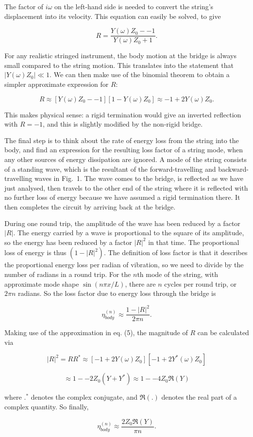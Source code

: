   The factor of $i \omega$ on the left-hand side is needed to convert the 
  string's displacement into its velocity. This equation can easily be solved, 
  to give 

  $$R=\dfrac{Y(\omega) Z_0 -- 1}{Y(\omega) Z_0 + 1} .\tag{4}$$ 

  For any realistic stringed instrument, the body motion at the bridge is 
  always small compared to the string motion. This translates into the 
  statement that $|Y(\omega) Z_0| \ll 1$. We can then make use of the binomial 
  theorem to obtain a simpler approximate expression for $R$: 

  $$R \approx [Y(\omega) Z_0 -- 1][1-Y(\omega) Z_0] \approx -1 +2Y(\omega) Z_0 
  .\tag{5}$$ 

  This makes physical sense: a rigid termination would give an inverted 
  reflection with $R=-1$, and this is slightly modified by the non-rigid 
  bridge. 

  The final step is to think about the rate of energy loss from the string into 
  the body, and find an expression for the resulting loss factor of a string 
  mode, when any other sources of energy dissipation are ignored. A mode of the 
  string consists of a standing wave, which is the resultant of the 
  forward-travelling and backward-travelling waves in Fig.\ 1. The wave comes 
  to the bridge, is reflected as we have just analysed, then travels to the 
  other end of the string where it is reflected with no further loss of energy 
  because we have assumed a rigid termination there. It then completes the 
  circuit by arriving back at the bridge. 

  During one round trip, the amplitude of the wave has been reduced by a factor 
  $|R|$. The energy carried by a wave is proportional to the square of its 
  amplitude, so the energy has been reduced by a factor $|R|^2$ in that time. 
  The proportional loss of energy is thus $(1-|R|^2)$. The definition of loss 
  factor is that it describes the proportional energy loss per radian of 
  vibration, so we need to divide by the number of radians in a round trip. For 
  the $n$th mode of the string, with approximate mode shape $\sin (n \pi x/L)$, 
  there are $n$ cycles per round trip, or $2 \pi n$ radians. So the loss factor 
  due to energy loss through the bridge is 

  $$\eta^{(n)}_{body} \approx \dfrac{1-|R|^2}{2 \pi n} . \tag{6}$$ 

  Making use of the approximation in eq. (5), the magnitude of $R$ can be 
  calculated via 

  $$|R|^2=R R^* \approx [-1+2Y(\omega) Z_0] [-1+2Y^*(\omega) Z_0]$$ 

  $$\approx 1 -- 2 Z_0 (Y + Y^*) \approx 1 -- 4 Z_0 \Re(Y)\tag{7}$$ 

  where $.^*$ denotes the complex conjugate, and $\Re(.)$ denotes the real part 
  of a complex quantity. So finally, 

  $$\eta^{(n)}_{body} \approx \dfrac{2 Z_0 \Re(Y)}{ \pi n} . \tag{8}$$ 